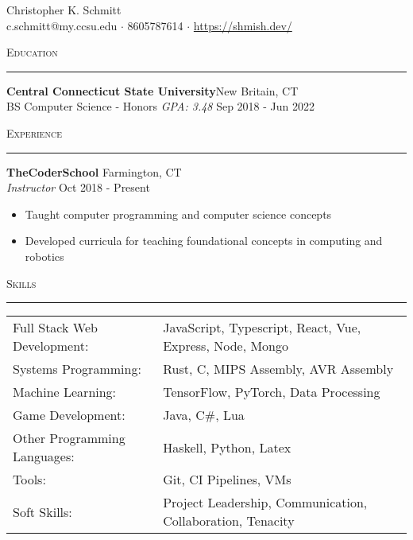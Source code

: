 \documentclass[a4paper]{article}
\newenvironment{cvsection}[1]{
  \noindent\textsc{#1}
  \vspace{4pt}
  \hrule
  \vspace{4pt}

}{\vspace{4pt}}
\newcommand{\school}[5] {
  \noindent\textbf{#1}\hfill #2\\
  \noindent#3 \textit{GPA: #4} \hfill #5\\
}
\newcommand{\employer}[4] {
  \noindent\textbf{#1} \hfill #2\\
  \noindent\textit{#3} \hfill #4\\
  \vspace{-8pt}
}
\begin{document}
  \begin{center}
    {\huge Christopher K. Schmitt}\\
    \vspace{8pt}
    c.schmitt@my.ccsu.edu $\cdot$ 8605787614 $\cdot$ \href{https://shmish.dev/}{https://shmish.dev/}\\
  \end{center}

  \begin{cvsection}{Education}
    \school{Central Connecticut State University}{New Britain, CT}{BS Computer Science - Honors}{3.48}{Sep 2018 - Jun 2022}
  \end{cvsection}

  \begin{cvsection}{Experience}
    \employer{TheCoderSchool}{Farmington, CT}{Instructor}{Oct 2018 - Present}
    
    \begin{itemize}
      \item Taught computer programming and computer science concepts
      \item Developed curricula for teaching foundational concepts in computing and robotics
    \end{itemize}
  \end{cvsection}

  \begin{cvsection}{Skills}
    \begin{tabular}{ l l }
      Full Stack Web Development:  & JavaScript, Typescript, React, Vue, Express, Node, Mongo  \\
      Systems Programming:         & Rust, C, MIPS Assembly, AVR Assembly                      \\
      Machine Learning:            & TensorFlow, PyTorch, Data Processing                      \\
      Game Development:            & Java, C\#, Lua                                            \\
      Other Programming Languages: & Haskell, Python, Latex                                    \\
      Tools:                       & Git, CI Pipelines, VMs                                    \\
      Soft Skills:                 & Project Leadership, Communication, Collaboration, Tenacity \\
    \end{tabular}\\
  \end{cvsection}
\end{document}
